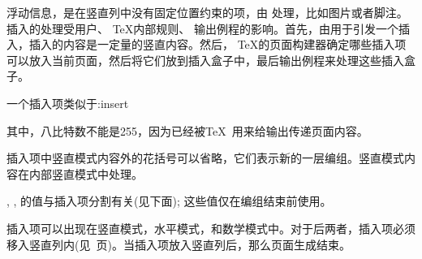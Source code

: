 \documentclass{book}
\begin{document}
浮动信息，是在竖直列中没有固定位置约束的项，由 处理，比如图片或者脚注。插入的处理受用户、 \TeX 内部规则、 输出例程的影响。首先，由用于引发一个插入，插入的内容是一定量的竖直内容。然后， \TeX 的页面构建器确定哪些插入项可以放入当前页面，然后将它们放到插入盒子中，最后输出例程来处理这些插入盒子。



一个插入项类似于:\cstoidx insert\par

\begin{disp}\lb{}\rb
\end{disp}

其中，八比特数不能是255，因为已经被\TeX\ 用来给输出传递页面内容。


插入项中竖直模式内容外的花括号可以省略，它们表示新的一层编组。竖直模式内容在内部竖直模式中处理。


, , 的值与插入项分割有关(见下面); 这些值仅在编组结束前使用。



插入项可以出现在竖直模式，水平模式，和数学模式中。对于后两者，插入项必须移入竖直列内(见~\pageref{migrate}页)。当插入项放入竖直列后，那么页面生成结束。


\end{document}
